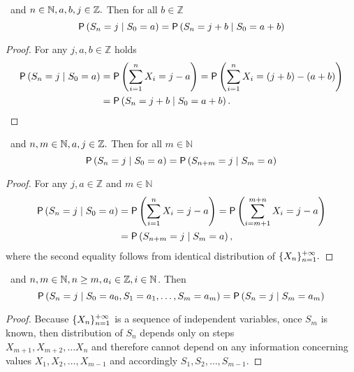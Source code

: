 \begin{lemma}\label{lemma-spatial_homogeneity}
  \Lrw\ and $n \in \mathbb{N}, a,b,j \in \mathbb{Z}.$ Then for all $b \in \mathbb Z$
\[
  \operatorname{\mathsf{P}} \left( S_n=j \mid S_0=a \right) =\operatorname{\mathsf{P}} \left( S_n=j+b \mid
    S_0=a+b \right)
\]
\end{lemma}

\begin{proof} For any $j, a, b \in \mathbb Z$ holds
  \[
    \begin{split}
      \pr \left( S_n=j \mid S_0=a \right) & =\pr \left( \suma X_i=j-a
      \right)
      =\pr \left( \suma X_i= \left( j+b \right) - \left( a+b \right) \right) \\
      & =\pr \left( S_n=j+b \mid S_0=a+b \right).
    \end{split}
 \]
\end{proof}


\begin{lemma}\label{lemma-temporal_homogeneity}
  \Lrw\ and $n,m \in \mathbb{N}, a,j \in \mathbb{Z}.$ Then for all $m \in \mathbb N$
   \[
     \operatorname{\mathsf{P}} \left( S_n=j \mid S_0=a \right) =\operatorname{\mathsf{P}} \left( S_{n+m}=j \mid
       S_m=a \right)
   \]
\end{lemma}
\begin{proof} For any $j, a \in \mathbb Z$ and $m \in \mathbb N$
  \[
    \begin{split}
      \pr \left( S_n=j \mid S_0=a \right) & =\pr \left( \suma X_i=j-a\right)
      =\pr \left( \suma[i][m+1][m+n]X_i=j-a \right)\\
      & =\pr \left( S_{n+m}=j \mid S_m=a \right),
    \end{split}
  \]
where the second equality follows from identical distribution of
$\{X_n\}_{n=1}^{{+\infty}}.$
\end{proof}

\begin{lemma}\label{lemma-markov_property}
 \Lrw\ and $n,m \in \mathbb{N}, n\geq m, a_i \in \mathbb{Z}, i\in \mathbb{N}$. Then
 \[
     \operatorname{\mathsf{P}} \left( S_n=j \mid S_0=a_0, S_1=a_1, \ldots, S_m=a_m \right)
     =\operatorname{\mathsf{P}} \left( S_n=j \mid S_m=a_m \right)
 \]
\end{lemma}
\begin{proof}
 Because $\{X_n\}_{n=1}^{+\infty}$ is a sequence of independent variables, once $S_m$ is known, then distribution of $S_n$ depends only on steps ~\\$X_{m+1}, X_{m+2}, \ldots X_n$ and therefore cannot depend on any information concerning values $X_1, X_2, \ldots, X_{m-1}$ and accordingly $S_1, S_2, \ldots, S_{m-1}.$
\end{proof}

